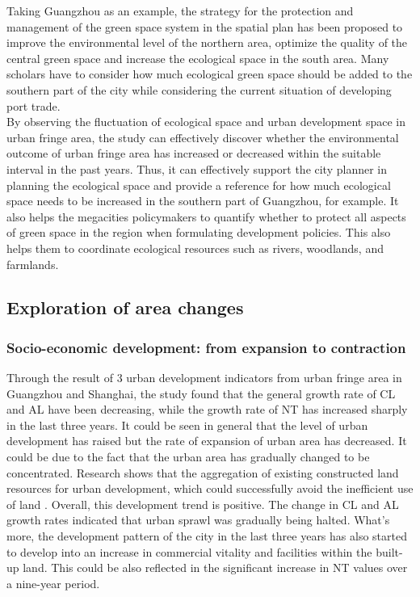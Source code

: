 Taking Guangzhou as an example, the strategy for the protection and management of the green space system in the spatial plan has been proposed to improve the environmental level of the northern area, optimize the quality of the central green space and increase the ecological space in the south area. Many scholars have to consider how much ecological green space should be added to the southern part of the city while considering the current situation of developing port trade.\\

By observing the fluctuation of ecological space and urban development space in urban fringe area, the study can effectively discover whether the environmental outcome of urban fringe area has increased or decreased within the suitable interval in the past years. Thus, it can effectively support the city planner in planning the ecological space and provide a reference for how much ecological space needs to be increased in the southern part of Guangzhou, for example. It also helps the megacities policymakers to quantify whether to protect all aspects of green space in the region when formulating development policies. This also helps them to coordinate ecological resources such as rivers, woodlands, and farmlands.\\



\subsection{Exploration of area changes}
\subsubsection{Socio-economic development: from expansion to contraction}
Through the result of 3 urban development indicators from urban fringe area in Guangzhou and Shanghai, the study found that the general growth rate of CL and AL have been decreasing, while the growth rate of NT has increased sharply in the last three years. It could be seen in general that the level of urban development has raised but the rate of expansion of urban area has decreased. It could be due to the fact that the urban area has gradually changed to be concentrated. Research shows that the aggregation of existing constructed land resources for urban development, which could successfully avoid the inefficient use of land \parencite{wang_dynamics_2020}. Overall, this development trend is positive. The change in CL and AL growth rates indicated that urban sprawl was gradually being halted. What’s more, the development pattern of the city in the last three years has also started to develop into an increase in commercial vitality and facilities within the built-up land. This could be also reflected in the significant increase in NT values over a nine-year period.\\

